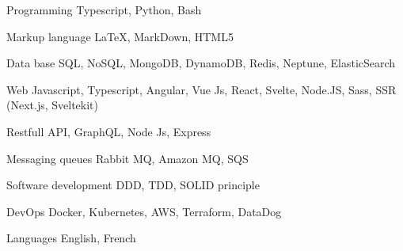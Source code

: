 


\begin{cvskills}


\cvskill
{Programming} %
{Typescript, Python, Bash} %


\cvskill
{Markup language} %
{LaTeX, MarkDown, HTML5} %



\cvskill
{Data base} %
{SQL, NoSQL, MongoDB, DynamoDB, Redis, Neptune, ElasticSearch} %


\cvskill
{Web} %
{Javascript, Typescript, Angular, Vue Js, React, Svelte, Node.JS, Sass, SSR (Next.js, Sveltekit) } %


\cvskill
{} %
{Restfull API, GraphQL, Node Js, Express} %


\cvskill
{Messaging queues} %
{Rabbit MQ, Amazon MQ, SQS} %




\cvskill
{Software development} %
{DDD, TDD, SOLID principle} %



\cvskill
{DevOps} %
{Docker, Kubernetes, AWS, Terraform, DataDog} %


\cvskill
{Languages} %
{English, French} %


\end{cvskills}
